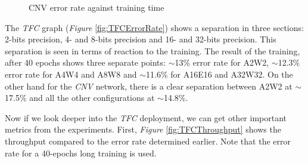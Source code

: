 \begin{figure}[htbp]
\centering
{}
\caption[CNV Error Rate]{CNV error rate against training time}
  \label{fig:CNVErrorRate}
\end{figure}

The \emph{TFC} graph (\emph{Figure} \ref{fig:TFCErrorRate}) shows a separation in three sections: 2-bits precision, 4- and 8-bits precision and 16- and 32-bits precision. This separation is seen in terms of reaction to the training. The result of the training, after 40 epochs shows three separate points: $\sim$13\% error rate for A2W2, $\sim$12.3\% error rate for A4W4 and A8W8 and $\sim$11.6\% for A16E16 and A32W32. On the other hand for the \emph{CNV} network, there is a clear separation between A2W2 at $\sim$17.5\% and all the other configurations at $\sim$14.8\%.

Now if we look deeper into the \emph{TFC} deployment, we can get other important metrics from the experiments. First, \emph{Figure} \ref{fig:TFCThroughput} shows the throughput compared to the error rate determined earlier. Note that the error rate for a 40-epochs long training is used.

